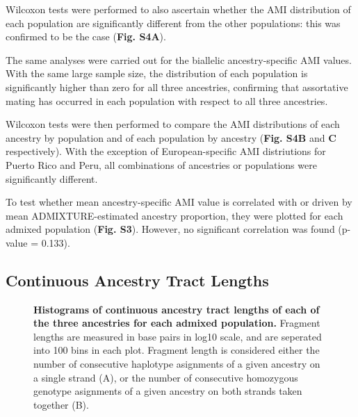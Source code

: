 \documentclass[11pt]{article}
\begin{document}
Wilcoxon tests were performed to also ascertain whether the AMI distribution of each population are significantly different from the other populations: this was confirmed to be the case (\textbf{Fig. S4A}). 

The same analyses were carried out for the biallelic ancestry-specific AMI values. With the same large sample size, the distribution of each population is significantly higher than zero for all three ancestries, confirming that assortative mating has occurred in each population with respect to all three ancestries.

Wilcoxon tests were then performed to compare the AMI distributions of each ancestry by population and of each population by ancestry (\textbf{Fig. S4B} and \textbf{C} respectively). With the exception of European-specific AMI distriutions for Puerto Rico and Peru, all combinations of ancestries or populations were significantly different. 

To test whether mean ancestry-specific AMI value is correlated with or driven by mean ADMIXTURE-estimated ancestry proportion, they were plotted for each admixed population (\textbf{Fig. S3}). However, no significant correlation was found (p-value = 0.133). 







\subsection{Continuous Ancestry Tract Lengths}




\begin{figure}[hbt!]%
    \centering
    \vspace*{0em}
    \vspace{.2cm}
    \caption{\textbf{
        Histograms of continuous ancestry tract lengths of each of the three ancestries for each admixed population.
    }
        Fragment lengths are measured in base pairs in log10 scale, and are seperated into 100 bins in each plot. Fragment length is considered either the number of consecutive haplotype asignments of a given ancestry on a single strand (A), or the number of consecutive homozygous genotype asignments of a given ancestry on both strands taken together (B).
    }
\end{figure}
\end{document}
